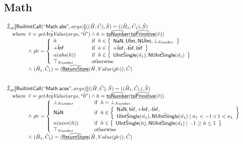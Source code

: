 \subsection{Math}

\[
\begin{array}{l}
\aI _{cp}\lbr \SF{BuiltintCall}(``\SF{Math.abs}",args)\rbr((\hat{H},\hat{C}), \hat{S})
  = ((\hat{H}_1, \hat{C}_1), \hat{S})\\
\quad\wherec{
  \hat{v}=\hat{\hf{getArgValue}}(args,\hat{``0"}) \land \hat{n}=\ahf{toNumber}(\ahf{toPrimitive}(\hat{v}))\\
  \land\ \hat{pv}   = 
  \left\{
    \begin{array}{l@{\quad\quad\quad}l}
      \hat{n}  & \ifc{\hat{n} \in \set{\hat{\SF{NaN}}, \hat{\SF{UInt}}, \hat{\SF{NUInt}}, \bot_{Number}}}\\
      \hat{\SF{+Inf}} & \ifc{\hat{n} \in \set{\hat{\SF{+Inf}}, \hat{\SF{-Inf}}, \hat{\SF{Inf}}}}\\
      \alpha(abs(\hat{n})) & \ifc{\hat{n} \in \set{\hat{\SF{UIntSingle}}(\hat{n_1}), \hat{\SF{NUIntSingle}}(\hat{n_1})}}\\
      \top_{Number} & \owc\\
    \end{array}
  \right.\\
  \land\ (\hat{H}_1, \hat{C}_1) = (\ahf{ReturnStore}(\hat{H}, Value(\hat{pv})), \hat{C})
  }\\
\\\\


\aI _{cp}\lbr \SF{BuiltintCall}(``\SF{Math.acos}",args)\rbr((\hat{H},\hat{C}), \hat{S})
  = ((\hat{H}_1, \hat{C}_1), \hat{S})\\
\quad\wherec{
  \hat{v}=\hat{\hf{getArgValue}}(args,\hat{``0"}) \land \hat{n}=\ahf{toNumber}(\ahf{toPrimitive}(\hat{v}))\\
  \land\ \hat{pv} = 
  \left\{
    \begin{array}{l@{\quad\quad\quad}l}
      \bot_{Number} & \ifc{\hat{n} = \bot_{Number}}\\
      \hat{\SF{NaN}} & \ifc{\hat{n} \in \set{\hat{\SF{NaN}}, \hat{\SF{Inf}}, \hat{\SF{+Inf}}, \hat{\SF{-Inf}}, \\\hat{\SF{UIntSingle}}(\hat{n_1}), \hat{\SF{NUIntSingle}}(\hat{n_1}) \mid n_1<-1 \lor 1<n_1}}\\
      \alpha(acos(\hat{n})) & \ifc{\hat{n} \in \set{\hat{\SF{UIntSingle}}(\hat{n}), \hat{\SF{NUIntSingle}}(\hat{n_1}) \mid -1\geq \hat{n} \leq 1}}\\
      \top_{Number} & \owc\\
    \end{array}
  \right.\\
  \land\ (\hat{H}_1, \hat{C}_1) = (\ahf{ReturnStore}(\hat{H}, Value(\hat{pv})), \hat{C})
  }\\
\\\\




\end{array}\]
